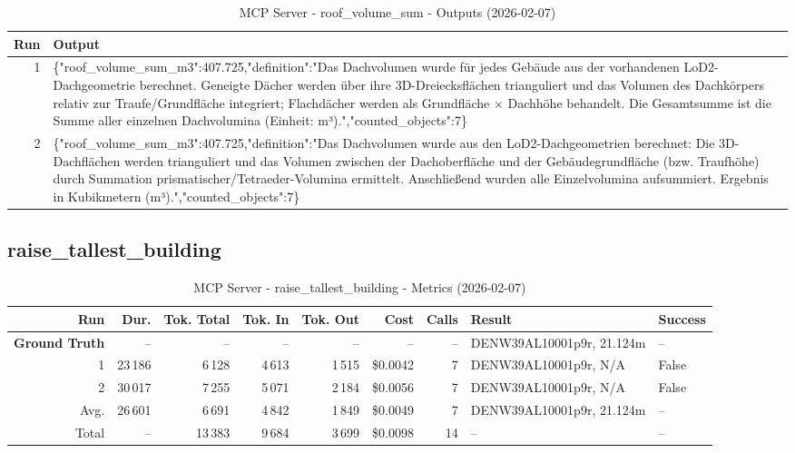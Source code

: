\documentclass[a4paper,11pt]{article}
\begin{document}
\begin{table}[ht]
\centering
\scriptsize
\caption{MCP Server - roof\_volume\_sum - Outputs (2026-02-07)}
\label{tab:mcp\_roof\_volume\_sum\_outputs\_2026-02-07}
\begin{tabular}{r p{12cm}}
\hline
Run & Output \\
\hline
1 & \{"roof\_volume\_sum\_m3":407.725,"definition":"Das Dachvolumen wurde für jedes Gebäude aus der vorhandenen LoD2-Dachgeometrie berechnet. Geneigte Dächer werden über ihre 3D-Dreiecksflächen trianguliert und das Volumen des Dachkörpers relativ zur Traufe/Grundfläche integriert; Flachdächer werden als Grundfläche × Dachhöhe behandelt. Die Gesamtsumme ist die Summe aller einzelnen Dachvolumina (Einheit: m³).","counted\_objects":7\} \\
2 & \{"roof\_volume\_sum\_m3":407.725,"definition":"Das Dachvolumen wurde aus den LoD2-Dachgeometrien berechnet: Die 3D-Dachflächen werden trianguliert und das Volumen zwischen der Dachoberfläche und der Gebäudegrundfläche (bzw. Traufhöhe) durch Summation prismatischer/Tetraeder-Volumina ermittelt. Anschließend wurden alle Einzelvolumina aufsummiert. Ergebnis in Kubikmetern (m³).","counted\_objects":7\} \\
\hline
\end{tabular}
\end{table}

\clearpage
\subsection{raise\_tallest\_building}

\begin{table}[ht]
\centering
\scriptsize
\caption{MCP Server - raise\_tallest\_building - Metrics (2026-02-07)}
\label{tab:mcp\_raise\_tallest\_building\_metrics\_2026-02-07}
\begin{tabular}{r r r r r r r p{3cm} l}
\hline
Run & Dur. & Tok. Total & Tok. In & Tok. Out & Cost & Calls & Result & Success \\
\hline
\textbf{Ground Truth} & -- & -- & -- & -- & -- & -- & DENW39AL10001p9r, 21.124m & -- \\
1 & 23\,186 & 6\,128 & 4\,613 & 1\,515 & \$0.0042 & 7 & DENW39AL10001p9r, N/A & False \\
2 & 30\,017 & 7\,255 & 5\,071 & 2\,184 & \$0.0056 & 7 & DENW39AL10001p9r, N/A & False \\
\hline
Avg. & 26\,601 & 6\,691 & 4\,842 & 1\,849 & \$0.0049 & 7 & DENW39AL10001p9r, 21.124m & -- \\
Total & -- & 13\,383 & 9\,684 & 3\,699 & \$0.0098 & 14 & -- & -- \\
\hline
\end{tabular}
\end{table}
\end{document}
